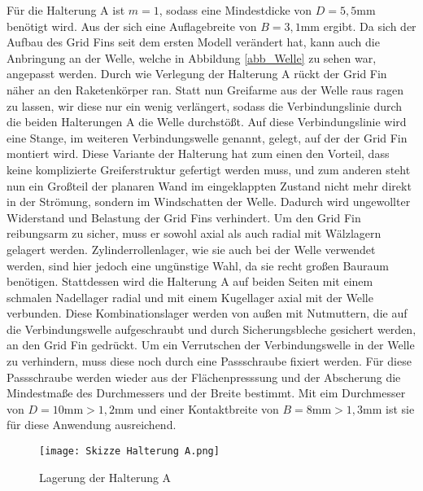 Für die Halterung A ist $m=1$, sodass eine Mindestdicke von $D=5,5$mm benötigt wird. Aus der sich eine Auflagebreite von $B = 3,1$mm ergibt. Da sich der Aufbau des Grid Fins seit dem ersten Modell verändert hat, kann auch die Anbringung an der Welle, welche in Abbildung \ref{abb_Welle} zu sehen war, angepasst werden. Durch wie Verlegung der Halterung A rückt der Grid Fin näher an den Raketenkörper ran. Statt nun Greifarme aus der Welle raus ragen zu lassen, wir diese nur ein wenig verlängert, sodass die Verbindungslinie durch die beiden Halterungen A die Welle durchstößt. Auf diese Verbindungslinie wird eine Stange, im weiteren Verbindungswelle genannt, gelegt, auf der der Grid Fin montiert wird. Diese Variante der Halterung hat zum einen den Vorteil, dass keine komplizierte Greiferstruktur gefertigt werden muss, und zum anderen steht nun ein Großteil der planaren Wand im eingeklappten Zustand nicht mehr direkt in der Strömung, sondern im Windschatten der Welle. Dadurch wird ungewollter Widerstand und Belastung der Grid Fins verhindert. Um den Grid Fin reibungsarm zu sicher, muss er sowohl axial als auch radial mit Wälzlagern gelagert werden. Zylinderrollenlager, wie sie auch bei der Welle verwendet werden, sind hier jedoch eine ungünstige Wahl, da sie recht großen Bauraum benötigen. Stattdessen wird die Halterung A auf beiden Seiten mit einem schmalen Nadellager radial und mit einem Kugellager axial mit der Welle verbunden. Diese Kombinationslager werden von außen mit Nutmuttern, die auf die Verbindungswelle aufgeschraubt und durch Sicherungsbleche gesichert werden, an den Grid Fin gedrückt. Um ein Verrutschen der Verbindungswelle in der Welle zu verhindern, muss diese noch durch eine Passschraube fixiert werden. Für diese Passschraube werden wieder aus der Flächenpresssung und der Abscherung die Mindestmaße des Durchmessers und der Breite bestimmt. Mit eim Durchmesser von $D = 10\mathrm{mm}> 1,2$mm und einer Kontaktbreite von $B = 8\mathrm{mm}> 1,3$mm ist sie für diese Anwendung ausreichend.
\begin{figure}[h] 
	\centering
	\texttt{[image: Skizze Halterung A.png]}
	\caption{Lagerung der Halterung A}
\end{figure}\\

